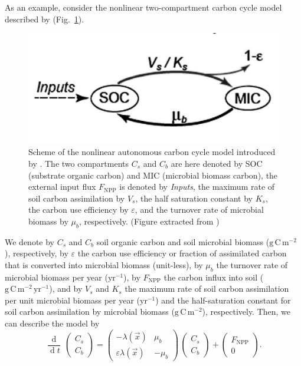 \documentclass[smallextended]{svjour3}
\newcommand{\deriv}[1]{\frac{\operatorname{d}}{\operatorname{d}#1}}
\newcommand{\gC}{\mathrm{g\,C}}
\newcommand{\yr}{\mathrm{yr}}
\newcommand{\meter}{\mathrm{m}}
\newcommand{\NPP}{\ensuremath{\mathrm{NPP}}}
\begin{document}
As an example, consider the nonlinear two-compartment carbon cycle model described by \citet{Wang2014BG} (Fig.~\ref{fig:Wang_model}).
\begin{figure}[htbp]
    \centering
    \includegraphics[width=0.5\linewidth]{figs/Wang_model.png}
    \caption[Schematic of the nonlinear autonomous carbon cycle model introduced by \citet{Wang2014BG}.]{Scheme of the nonlinear autonomous carbon cycle model introduced by \citet{Wang2014BG}. 
    The two compartments $C_s$ and $C_b$ are here denoted by SOC (substrate organic carbon) and MIC (microbial biomass carbon), the external input flux $F_{\NPP}$ is denoted by \emph{Inputs}, the maximum rate of soil carbon assimilation by $V_s$, the half saturation constant by $K_s$, the carbon use efficiency by $\varepsilon$, and the turnover rate of microbial biomass by $\mu_b$, respectively.
      (Figure extracted from \citet{Wang2014BG})}\label{fig:Wang_model}
\end{figure}
We denote by $C_s$ and $C_b$ soil organic carbon and soil microbial biomass ($\gC\,\meter^{-2}$), respectively, by $\varepsilon$ the carbon use efficiency or fraction of assimilated carbon that is converted into microbial biomass (unit-less), by $\mu_b$ the turnover rate of microbial biomass per year ($\yr^{-1}$), by $F_{\NPP}$ the carbon influx into soil ($\gC\,\meter^{-2}\,\yr^{-1}$), and by $V_s$ and $K_s$ the maximum rate of soil carbon assimilation per unit microbial biomass per year ($\yr^{-1}$) and the half-saturation constant for soil carbon assimilation by microbial biomass ($\gC\,\meter^{-2}$), respectively.
Then, we can describe the model by
\begin{equation*}
    \deriv{t}\,\left(\begin{matrix}C_{s}\\C_{b}\end{matrix}\right) = \left(\begin{matrix}- \lambda(\vec{x}) & \mu_{b}\\\varepsilon \lambda(\vec{x}) & - \mu_{b}\end{matrix}\right) \, \left(\begin{matrix}C_{s}\\C_{b}\end{matrix}\right) + \left(\begin{matrix}F_{\NPP}\\0\end{matrix}\right).
\end{equation*}
\end{document}
